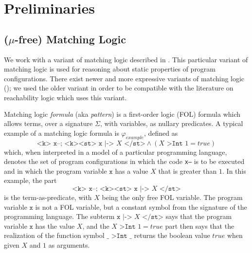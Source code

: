 \section{Preliminaries}

\subsection{($\mu$-free) Matching Logic}

We work with a variant of matching logic described in
\cite{StefanescuCMMSR19,RosuSCM13lics}.
This particular variant of matching logic is used for reasoning about static properties of program configurations.
There exist newer and more expressive variants of matching logic (\cite{MmL, MLexplained});
we used the older variant in order to be compatible with the literature on reachability logic which uses this variant.

Matching logic \emph{formula} (aka \emph{pattern}) is a first-order logic (FOL) formula which allows terms,
over a signature $\Sigma$, with variables, as nullary predicates.
A typical example of a matching logic formula is $\varphi_{\mathit{example}}$, defined as
\begin{equation}\label{eqn:exampleMLPattern}
\texttt{<k> x--; <k><st> x} \texttt{ |-> } X\texttt{ </st>} \land (X \texttt{ >Int } 1 = \mathit{true})
\end{equation}
which, when interpreted in a model of a particular programming language,
denotes the set of program configurations in which the code \texttt{x--} is to be executed
and in which the program variable $\texttt{x}$ has a value $X$ that is greater than $1$.
In this example, the part
\begin{equation*}
    \texttt{<k> x--; <k><st> x} \texttt{ |-> } X\texttt{ </st>}
\end{equation*}
is the term-as-predicate, with $X$ being the only free FOL variable.
The program variable $\texttt{x}$ is not a FOL variable, but a constant symbol from the signature of the programming language.
The subterm $\texttt{x} \texttt{ |-> } X\texttt{ </st>}$ says that the program variable $\texttt{x}$
has the value $X$, and the $X \texttt{ >Int } 1 = \mathit{true}$ part then says that the realization
of the function symbol $\_ \texttt{ >Int } \_$ returns the boolean value $\mathit{true}$ when given $X$ and $1$
as arguments.

